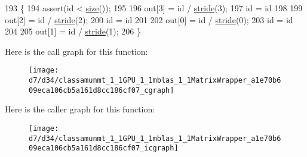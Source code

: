 \begin{DoxyCode}
193   \{
194     assert(\textcolor{keywordtype}{id} < \hyperlink{classamunmt_1_1GPU_1_1mblas_1_1MatrixWrapper_aed1483dbf0148749d04eea433582e802}{size}());
195 
196     out[3] = \textcolor{keywordtype}{id} / \hyperlink{classamunmt_1_1GPU_1_1mblas_1_1MatrixWrapper_a8e0bd961034d3596ec4a93dfaf58c5a7}{stride}(3);
197     \textcolor{keywordtype}{id} = \textcolor{keywordtype}{id} %
198 
199     out[2] = \textcolor{keywordtype}{id} / \hyperlink{classamunmt_1_1GPU_1_1mblas_1_1MatrixWrapper_a8e0bd961034d3596ec4a93dfaf58c5a7}{stride}(2);
200     \textcolor{keywordtype}{id} = \textcolor{keywordtype}{id} %
201 
202     out[0] = \textcolor{keywordtype}{id} / \hyperlink{classamunmt_1_1GPU_1_1mblas_1_1MatrixWrapper_a8e0bd961034d3596ec4a93dfaf58c5a7}{stride}(0);
203     \textcolor{keywordtype}{id} = \textcolor{keywordtype}{id} %
204 
205     out[1] = \textcolor{keywordtype}{id} / \hyperlink{classamunmt_1_1GPU_1_1mblas_1_1MatrixWrapper_a8e0bd961034d3596ec4a93dfaf58c5a7}{stride}(1);
206   \}
\end{DoxyCode}


Here is the call graph for this function\+:
\nopagebreak
\begin{figure}[H]
\begin{center}
\leavevmode
\texttt{[image: d7/d34/classamunmt\_1\_1GPU\_1\_1mblas\_1\_1MatrixWrapper\_a1e70b609eca106cb5a161d8cc186cf07\_cgraph]}
\end{center}
\end{figure}




Here is the caller graph for this function\+:
\nopagebreak
\begin{figure}[H]
\begin{center}
\leavevmode
\texttt{[image: d7/d34/classamunmt\_1\_1GPU\_1\_1mblas\_1\_1MatrixWrapper\_a1e70b609eca106cb5a161d8cc186cf07\_icgraph]}
\end{center}
\end{figure}


